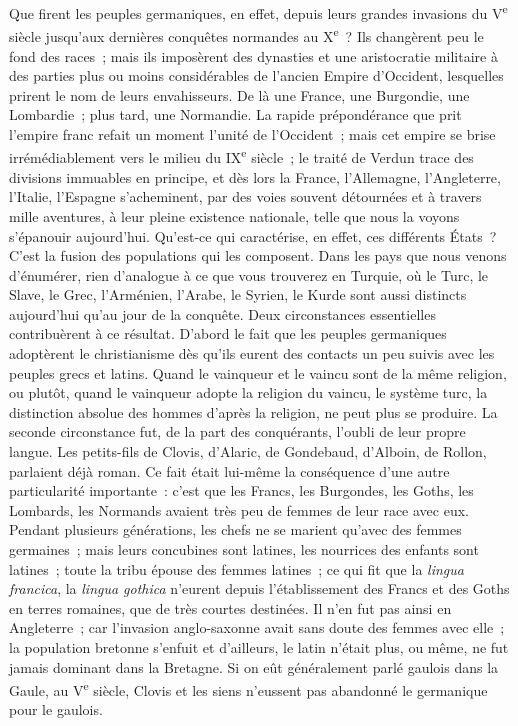 \documentclass[twoside]{book} %
\newcommand\orgName[1]{#1}
\newcommand\persName[1]{#1}
\newcommand\placeName[1]{#1}
\begin{document}
Que firent les {\orgName peuples germaniques}, en effet, depuis leurs grandes invasions du V\textsuperscript{e} siècle jusqu’aux dernières conquêtes normandes au X\textsuperscript{e} ? Ils changèrent peu le fond des races ; mais ils imposèrent des dynasties et une aristocratie militaire à des parties plus ou moins considérables de l’ancien {\orgName Empire d’Occident}, lesquelles prirent le nom de leurs envahisseurs. De là une {\placeName France}, une {\placeName Burgondie}, une {\placeName Lombardie} ; plus tard, une {\placeName Normandie}. La rapide prépondérance que prit l’{\orgName empire franc} refait un moment l’unité de l’{\orgName Occident} ; mais cet empire se brise irrémédiablement vers le milieu du IX\textsuperscript{e} siècle ; le traité de Verdun trace des divisions immuables en principe, et dès lors la {\orgName France}, l’{\orgName Allemagne}, l’{\orgName Angleterre}, l’{\orgName Italie}, l’{\orgName Espagne} s’acheminent, par des voies souvent détournées et à travers mille aventures, à leur pleine existence nationale, telle que nous la voyons s’épanouir aujourd’hui. Qu’est-ce qui caractérise, en effet, ces différents États ? C’est la fusion des populations qui les composent. Dans les pays que nous venons d’énumérer, rien d’analogue à ce que vous trouverez en {\placeName Turquie}, où le Turc, le Slave, le Grec, l’Arménien, l’Arabe, le Syrien, le Kurde sont aussi distincts aujourd’hui qu’au jour de la conquête. Deux circonstances essentielles contribuèrent à ce résultat. D’abord le fait que les {\orgName peuples germaniques} adoptèrent le christianisme dès qu’ils eurent des contacts un peu suivis avec les {\orgName peuples grecs et latins}. Quand le vainqueur et le vaincu sont de la même religion, ou plutôt, quand le vainqueur adopte la religion du vaincu, le système turc, la distinction absolue des hommes d’après la religion, ne peut plus se produire. La seconde circonstance fut, de la part des conquérants, l’oubli de leur propre langue. Les petits-fils de {\persName Clovis}, d’{\persName Alaric}, de {\persName Gondebaud}, d’{\persName Alboin}, de {\persName Rollon}, parlaient déjà roman. Ce fait était lui-même la conséquence d’une autre particularité importante : c’est que les {\orgName Francs}, les {\orgName Burgondes}, les {\orgName Goths}, les {\orgName Lombards}, les {\orgName Normands} avaient très peu de femmes de leur race avec eux. Pendant plusieurs générations, les chefs ne se marient qu’avec des femmes germaines ; mais leurs concubines sont latines, les nourrices des enfants sont latines ; toute la tribu épouse des femmes latines ; ce qui fit que la {\itshape lingua francica}, la {\itshape lingua gothica} n’eurent depuis l’établissement des {\orgName Francs} et des {\orgName Goths} en {\placeName terres romaines}, que de très courtes destinées. Il n’en fut pas ainsi en {\placeName Angleterre} ; car l’invasion anglo-saxonne avait sans doute des femmes avec elle ; la {\orgName population bretonne} s’enfuit et d’ailleurs, le latin n’était plus, ou même, ne fut jamais dominant dans la {\placeName Bretagne}. Si on eût généralement parlé gaulois dans la {\placeName Gaule}, au V\textsuperscript{e} siècle, {\persName Clovis} et les siens n’eussent pas abandonné le germanique pour le gaulois.\par
\end{document}
